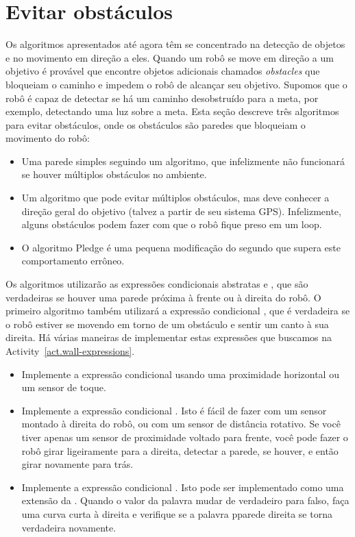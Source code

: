 \section{Evitar obstáculos}\label{s.obstacle-avoidance}

Os algoritmos apresentados até agora têm se concentrado na detecção de objetos e no movimento em direção a eles. Quando um robô se move em direção a um objetivo é provável que encontre objetos adicionais chamados \emph{obstacles} que bloqueiam o caminho e impedem o robô de alcançar seu objetivo. Supomos que o robô é capaz de detectar se há um caminho desobstruído para a meta, por exemplo, detectando uma luz sobre a meta. Esta seção descreve três algoritmos para evitar obstáculos, onde os obstáculos são paredes que bloqueiam o movimento do robô:
\begin{itemize}
\item Uma parede simples seguindo um algoritmo, que infelizmente não funcionará se houver múltiplos obstáculos no ambiente.
\item Um algoritmo que pode evitar múltiplos obstáculos, mas deve conhecer a direção geral do objetivo (talvez a partir de seu sistema GPS). Infelizmente, alguns obstáculos podem fazer com que o robô fique preso em um loop.
\item O algoritmo Pledge é uma pequena modificação do segundo que supera este comportamento errôneo.
\end{itemize}
Os algoritmos utilizarão as expressões condicionais abstratas  e , que são verdadeiras se houver uma parede próxima à frente ou à direita do robô. O primeiro algoritmo também utilizará a expressão condicional , que é verdadeira se o robô estiver se movendo em torno de um obstáculo e sentir um canto à sua direita. Há várias maneiras de implementar estas expressões que buscamos na Activity~\ref{act.wall-expressions}.

\begin{framed}
\begin{itemize}
\item Implemente a expressão condicional  usando uma proximidade horizontal ou um sensor de toque.
\item Implemente a expressão condicional . Isto é fácil de fazer com um sensor montado à direita do robô, ou com um sensor de distância rotativo. Se você tiver apenas um sensor de proximidade voltado para frente, você pode fazer o robô girar ligeiramente para a direita, detectar a parede, se houver, e então girar novamente para trás.
\item Implemente a expressão condicional . Isto pode ser implementado como uma extensão da . Quando o valor da palavra  mudar de verdadeiro para falso, faça uma curva curta à direita e verifique se a palavra p{parede direita} se torna verdadeira novamente.
\end{itemize}
\end{framed}

